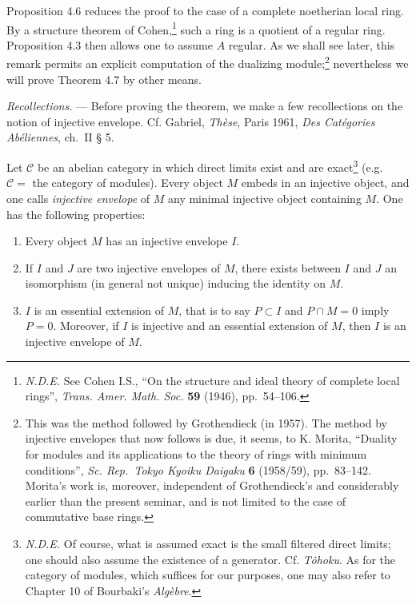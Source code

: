 \documentclass[
  11pt,
  a4paper,
]{book}
\begin{document}
Proposition 4.6 reduces the proof to the case of a complete noetherian
local ring. By a structure theorem of Cohen,\footnote{\emph{N.D.E.} See
  Cohen I.S., ``On the structure and ideal theory of complete local
  rings'', \emph{Trans. Amer. Math. Soc.} \textbf{59} (1946),
  pp.~54--106.} such a ring is a quotient of a regular ring. Proposition
4.3 then allows one to assume \(A\) regular. As we shall see later, this
remark permits an explicit computation of the dualizing
module;\footnote{This was the method followed by Grothendieck (in 1957).
  The method by injective envelopes that now follows is due, it seems,
  to K. Morita, ``Duality for modules and its applications to the theory
  of rings with minimum conditions'', \emph{Sc. Rep.~Tokyo Kyoiku
  Daigaku} \textbf{6} (1958/59), pp.~83--142. Morita's work is,
  moreover, independent of Grothendieck's and considerably earlier than
  the present seminar, and is not limited to the case of commutative
  base rings.} nevertheless we will prove Theorem 4.7 by other means.

\emph{Recollections.} --- Before proving the theorem, we make a few
recollections on the notion of injective envelope. Cf. Gabriel,
\emph{Thèse}, Paris 1961, \emph{Des Catégories Abéliennes}, ch.~II § 5.

Let \(\mathcal{C}\) be an abelian category in which direct limits exist
and are exact\footnote{\emph{N.D.E.} Of course, what is assumed exact is
  the small filtered direct limits; one should also assume the existence
  of a generator. Cf. \emph{Tôhoku}. As for the category of modules,
  which suffices for our purposes, one may also refer to Chapter 10 of
  Bourbaki's \emph{Algèbre}.} (e.g.~\(\mathcal{C} =\) the category of
modules). Every object \(M\) embeds in an injective object, and one
calls \emph{injective envelope} of \(M\) any minimal injective object
containing \(M\). One has the following properties:

\begin{enumerate}
\def\labelenumi{(\roman{enumi})}
\item
  Every object \(M\) has an injective envelope \(I\).
\item
  If \(I\) and \(J\) are two injective envelopes of \(M\), there exists
  between \(I\) and \(J\) an isomorphism (in general not unique)
  inducing the identity on \(M\).
\item
  \(I\) is an essential extension of \(M\), that is to say
  \(P \subset I\) and \(P \cap M = {0}\) imply \(P = {0}\). Moreover, if
  \(I\) is injective and an essential extension of \(M\), then \(I\) is
  an injective envelope of \(M\).
\end{enumerate}
\end{document}
